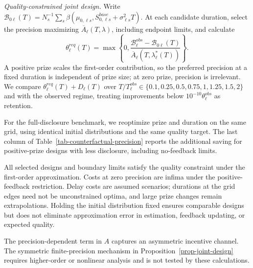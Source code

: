 \textit{Quality-constrained joint design.} Write $\mathcal B_{0\ell}(T)=N_s^{-1}\sum_s\beta(\mu_{0,\ell s},S_{0,\ell s}^{base}+\sigma_{\ell s}^2T)$. At each candidate duration, select the precision maximizing $\overline A_\ell(T,\lambda)$, including endpoint limits, and calculate
\[
\theta_\ell^{req}(T)=\max\left\{0,\frac{\mathcal B_\ell^{obs}-\mathcal B_{0\ell}(T)}{\overline A_\ell(T,\lambda_\ell^*(T))}\right\}.
\]
A positive prize scales the first-order contribution, so the preferred precision at a fixed duration is independent of prize size; at zero prize, precision is irrelevant. We compare $\theta_\ell^{req}(T)+D_\ell(T)$ over $T/T_\ell^{obs}\in\{0.1,0.25,0.5,0.75,1,1.25,1.5,2\}$ and with the observed regime, treating improvements below $10^{-10}\theta_\ell^{obs}$ as retention.

For the full-disclosure benchmark, we reoptimize prize and duration on the same grid, using identical initial distributions and the same quality target. The last column of Table~\ref{tab-counterfactual-precision} reports the additional saving for positive-prize designs with less disclosure, including no-feedback limits.

All selected designs and boundary limits satisfy the quality constraint under the first-order approximation. Costs at zero precision are infima under the positive-feedback restriction. Delay costs are assumed scenarios; durations at the grid edges need not be unconstrained optima, and large prize changes remain extrapolations. Holding the initial distribution fixed ensures comparable designs but does not eliminate approximation error in estimation, feedback updating, or expected quality.

The precision-dependent term in $A$ captures an asymmetric incentive channel. The symmetric finite-precision mechanism in Proposition~\ref{prop-joint-design} requires higher-order or nonlinear analysis and is not tested by these calculations.
